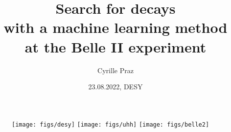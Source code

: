 \title[\BKnn at Belle II]{Search for \BKnn decays\\ with a machine learning method \\ at the Belle II experiment}
\author[Cyrille Praz]{Cyrille Praz}
\date[23.08.2022]{23.08.2022, DESY}
\begin{frame}
\begin{figure}
\begin{center}
\texttt{[image: figs/desy]}
\hspace{0.3cm}
\texttt{[image: figs/uhh]}
\hspace{0.3cm}
\texttt{[image: figs/belle2]}
\end{center}
\end{figure}
\vspace{-0.75cm}
\titlepage
\end{frame}
